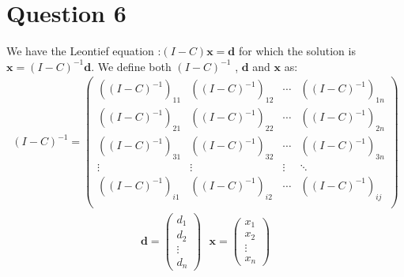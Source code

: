 \documentclass[11pt]{article}
\begin{document}
\section{Question 6}
We have the Leontief equation :$(I-C)\textbf{x}=\textbf{d}$ for which the solution is $\textbf{x}=(I-C)^{-1}\textbf{d}$.
We define both $(I-C)^{-1}$ , $\textbf{d}$ and $\textbf{x}$ as:
\begin{align*}
(I-C)^{-1}=
\left(\begin{array}{cccccc|c}
     ((I-C)^{-1})_{11}  &   ((I-C)^{-1})_{12}  &      \cdots  &  ((I-C)^{-1})_{1n}  \\
     ((I-C)^{-1})_{21}  &   ((I-C)^{-1})_{22}  &      \cdots  &  ((I-C)^{-1})_{2n}  \\
     ((I-C)^{-1})_{31}  &   ((I-C)^{-1})_{32}  &     \cdots  &  ((I-C)^{-1})_{3n}  \\ 
     \vdots          &   \vdots  &   \vdots   &   \ddots  \\
     ((I-C)^{-1})_{i1}  &  ((I-C)^{-1})_{i2}  &     \cdots  &   ((I-C)^{-1})_{ij}  \\ 
\end{array}\right)
\end{align*}
\begin{align*}
\textbf{d}= 
\left(\begin{array}{c}
d_1\\
d_2\\
\vdots \\
d_n
\end{array}\right)
\text{   }
\textbf{x}= 
\left(\begin{array}{c}
x_1\\
x_2\\
\vdots \\
x_n
\end{array}\right)
\end{align*}
\end{document}
